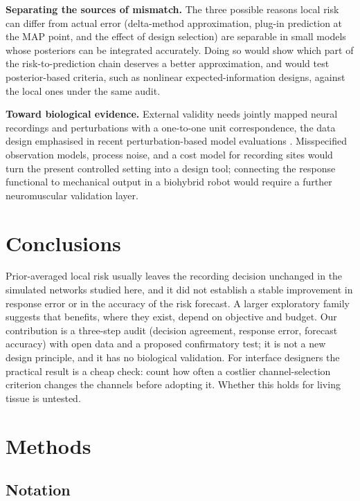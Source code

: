 \textbf{Separating the sources of mismatch.} The three possible reasons local risk can differ from actual error (delta-method approximation, plug-in prediction at the MAP point, and the effect of design selection) are separable in small models whose posteriors can be integrated accurately. Doing so would show which part of the risk-to-prediction chain deserves a better approximation, and would test posterior-based criteria, such as nonlinear expected-information designs, against the local ones under the same audit.

\textbf{Toward biological evidence.} External validity needs jointly mapped neural recordings and perturbations with a one-to-one unit correspondence, the data design emphasised in recent perturbation-based model evaluations \cite{ref08}. Misspecified observation models, process noise, and a cost model for recording sites would turn the present controlled setting into a design tool; connecting the response functional to mechanical output in a biohybrid robot \cite{ref01,ref02} would require a further neuromuscular validation layer.

\section{Conclusions}

Prior-averaged local risk usually leaves the recording decision unchanged in the simulated networks studied here, and it did not establish a stable improvement in response error or in the accuracy of the risk forecast. A larger exploratory family suggests that benefits, where they exist, depend on objective and budget. Our contribution is a three-step audit (decision agreement, response error, forecast accuracy) with open data and a proposed confirmatory test; it is not a new design principle, and it has no biological validation. For interface designers the practical result is a cheap check: count how often a costlier channel-selection criterion changes the channels before adopting it. Whether this holds for living tissue is untested.

\section{Methods}

\subsection{Notation}

